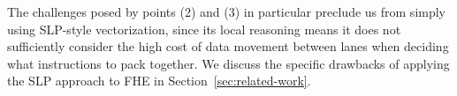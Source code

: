 The challenges posed by points (2) and (3) in particular preclude us from simply using SLP-style vectorization, since its local reasoning means it does not sufficiently consider the high cost of data movement between lanes when deciding what instructions to pack together.
We discuss the specific drawbacks of applying the SLP approach to FHE in Section~\ref{sec:related-work}.
